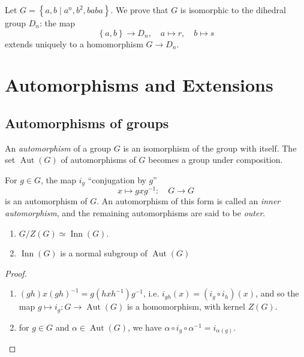 \begin{example}
  \label{example-presentation-universal-property}
  Let \( G = \left\lbrace a, b \mid a^n, b^2, baba \right\rbrace \).
  We prove that \( G \) is isomorphic to the dihedral group \( D_n \): the map
  \[
    \left\lbrace a, b \right\rbrace \to D_n,\quad a \mapsto r,\quad b \mapsto s
  \]
  extends uniquely to a homomorphism \( G \to D_n \).
\end{example}

\section{Automorphisms and Extensions}
\label{section-automorphisms-and-extensions}

\subsection{Automorphisms of groups}
\label{subsection-automorphisms-of-groups}


\begin{definition}
  \label{definition-automorphism}
  An \emph{automorphism} of a group \( G \) is an isomorphism of the group with itself.
  The set \( \operatorname{Aut}(G) \) of automorphisms of \( G \) becomes a group under composition.
\end{definition}

\begin{definition}
  \label{definition-inner-automorphism}
  \label{definition-outer-automorphism}
  For \( g \in G \), the map \( i_g \) ``conjugation by \( g \)''
  \[
    x \mapsto g x g^{-1}:\quad G \to G
  \]
  is an automorphism of \( G \).
  An automorphism of this form is called an \emph{inner automorphism}, and the remaining automorphisms are said to be \emph{outer}.
\end{definition}

\begin{proposition}
  \label{proposition-inner-automorphisms-properties}
  \begin{enumerate}
    \item \( G / Z(G) \simeq \operatorname{Inn}(G) \).
    \item \( \operatorname{Inn}(G) \) is a normal subgroup of \( \operatorname{Aut}(G) \)
  \end{enumerate}
\end{proposition}
\begin{proof}
\begin{enumerate}
  \item \( (gh) x (gh)^{-1} = g(h x h^{-1})g^{-1} \), i.e. \( i_{gh}(x) = (i_g \circ i_h)(x) \), and so the map \( g \mapsto i_g: G \to \operatorname{Aut}(G) \) is a homomorphism, with kernel \( Z(G) \).
  \item for \( g \in G \) and \( \alpha \in \operatorname{Aut}(G) \), we have \( \alpha \circ i_g \circ \alpha^{-1} = i_{\alpha(g)} \).
\end{enumerate}
\end{proof}

